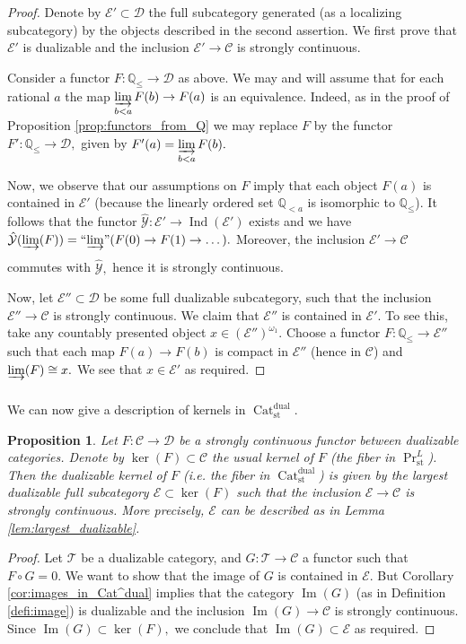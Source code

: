 \documentclass[11pt,leqno]{amsart}
\newtheorem{prop}[theo]{Proposition}
\numberwithin{equation}{section}
\def\Q{\mathbb{Q}}
\newcommand{\indlim}[1][]{\mathop{\varinjlim}\limits_{#1}}
\newcommand{\inddlim}[1][]{{``{\indlim[#1]}"}}
\newcommand{\Cat}{\operatorname{Cat}}
\newcommand{\st}{\operatorname{st}}
\newcommand{\dual}{\operatorname{dual}}
\newcommand{\cD}{{\mathcal D}}
\newcommand{\cC}{{\mathcal C}}
\newcommand{\cE}{{\mathcal E}}
\newcommand{\cY}{{\mathcal Y}}
\newcommand{\cT}{{\mathcal T}}
\newcommand{\im}{\operatorname{Im}}
\newcommand{\Ind}{\operatorname{Ind}}
\begin{document}
\begin{proof}Denote by $\cE'\subset\cD$ the full subcategory generated (as a localizing subcategory) by the objects described in the second assertion. We first prove that $\cE'$ is dualizable and the inclusion $\cE'\to\cC$ is strongly continuous. 

Consider a functor $F:\Q_{\leq}\to\cD$ as above. We may and will assume that for each rational $a$ the map $\indlim[b<a]F(b)\to F(a)$ is an equivalence. Indeed, as in the proof of Proposition \ref{prop:functors_from_Q} we may replace $F$ by the functor $F':\Q_{\leq}\to\cD,$ given by $F'(a)=\indlim[b<a]F(b).$ 

Now, we observe that our assumptions on $F$ imply that each object $F(a)$ is contained in $\cE'$ (because the linearly ordered set $\Q_{<a}$ is isomorphic to $\Q_{\leq}$). It follows that the functor $\hat{\cY}:\cE'\to \Ind(\cE')$ exists and we have $\hat{\cY}(\indlim[](F))=\inddlim(F(0)\to F(1)\to\dots).$ Moreover, the inclusion $\cE'\to \cC$ commutes with $\hat{\cY},$ hence it is strongly continuous.

Now, let $\cE''\subset \cD$ be some full dualizable subcategory, such that the inclusion $\cE''\to\cC$ is strongly continuous. We claim that $\cE''$ is contained in $\cE'.$ To see this, take any countably presented object $x\in(\cE'')^{\omega_1}.$ Choose a functor $F:\Q_{\leq}\to \cE''$ such that each map $F(a)\to F(b)$ is compact in $\cE''$ (hence in $\cC$) and $\indlim[](F)\cong x.$ We see that $x\in\cE'$ as required.\end{proof}

We can now give a description of kernels in $\Cat_{\st}^{\dual}.$

\begin{prop}\label{prop:ker^dual} Let $F:\cC\to\cD$ be a strongly continuous functor between dualizable categories. Denote by $\ker(F)\subset\cC$ the usual kernel of $F$ (the fiber in $\Pr^L_{\st}$). Then the dualizable kernel of $F$ (i.e. the fiber in $\Cat_{\st}^{\dual}$) is given by the largest dualizable full subcategory $\cE\subset\ker(F)$ such that the inclusion $\cE\to\cC$ is strongly continuous. More precisely, $\cE$ can be described as in Lemma \ref{lem:largest_dualizable}.\end{prop}

\begin{proof}Let $\cT$ be a dualizable category, and $G:\cT\to\cC$ a functor such that $F\circ G=0.$ We want to show that the image of $G$ is contained in $\cE.$ But Corollary \ref{cor:images_in_Cat^dual} implies that the category $\im(G)$ (as in Definition \ref{defi:image}) is dualizable and the inclusion $\im(G)\to\cC$ is strongly continuous. Since $\im(G)\subset\ker(F),$ we conclude that $\im(G)\subset\cE$ as required.\end{proof}
\end{document}
